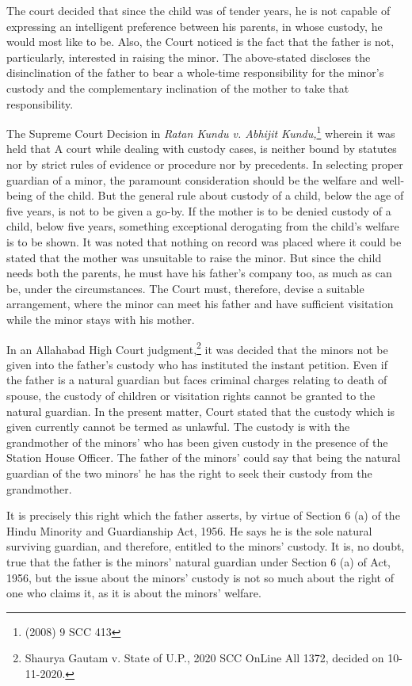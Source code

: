 \begin{multicols}{2}
\noi
The court decided that since the child was of tender years, he is not capable of expressing an
intelligent preference between his parents, in whose custody, he would most like to be. Also, the
Court noticed is the fact that the father is not, particularly, interested in raising the minor. The
above-stated discloses the disinclination of the father to bear a whole-time responsibility for the
minor’s custody and the complementary inclination of the mother to take that responsibility.

\noi
The Supreme Court Decision in \textit{Ratan Kundu v. Abhijit Kundu,}\footnote{(2008) 9 SCC 413} wherein it was held that A court while dealing with custody cases, is neither bound by statutes nor by strict rules of evidence or procedure nor by precedents. In selecting proper guardian of a minor, the paramount consideration should be the welfare and well-being of the child. But the general rule about custody of a child, below the age of five years, is not to be given a go-by. If the mother is to be denied custody of a child, below five years, something exceptional derogating from the child’s welfare is to be shown. It was noted that nothing on record was placed where it could be stated that the
mother was unsuitable to raise the minor. But since the child needs both the parents, he must have
his father’s company too, as much as can be, under the circumstances. The Court must, therefore,
devise a suitable arrangement, where the minor can meet his father and have sufficient visitation
while the minor stays with his mother.

\noi
In an Allahabad High Court judgment,\footnote{Shaurya Gautam v. State of U.P., 2020 SCC OnLine All 1372, decided on 10-11-2020.} it was decided that the minors not be given into the
father’s custody who has instituted the instant petition. Even if the father is a natural guardian
but faces criminal charges relating to death of spouse, the custody of children or visitation rights
cannot be granted to the natural guardian. In the present matter, Court stated that the custody
which is given currently cannot be termed as unlawful. The custody is with the grandmother of
the minors’ who has been given custody in the presence of the Station House Officer. The father
of the minors’ could say that being the natural guardian of the two minors’ he has the right to seek
their custody from the grandmother.

\noi
It is precisely this right which the father asserts, by virtue of Section 6 (a) of the Hindu Minority
and Guardianship Act, 1956. He says he is the sole natural surviving guardian, and therefore,
entitled to the minors’ custody. It is, no doubt, true that the father is the minors’ natural guardian
under Section 6 (a) of Act, 1956, but the issue about the minors’ custody is not so much about the
right of one who claims it, as it is about the minors’ welfare.


\end{multicols}
